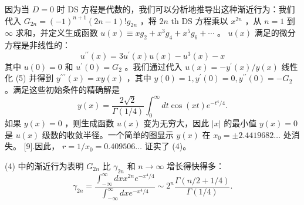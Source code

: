 \documentclass[UTF8]{article}
\begin{document}
因为当    $D=0$    时 DS 方程是代数的，我们可以分析地推导出这种渐近行为：我们代入    $G_{2 n}=(-1)^{n+1}(2 n-1) ! g_{2 n}$    ，将    $2 n$    th DS 方程乘以    $x^{2 n}$    ，从    $n=1$    到    $\infty$    求和，并定义生成函数    $u(x) \equiv x g_2+x^3 g_4+x^5 g_6+\cdots$    。    $u(x)$    满足的微分方程是非线性的：
    $$u^{\prime \prime}(x)=3 u^{\prime}(x) u(x)-u^3(x)-x
$$    其中    $u(0)=0$    和    $u^{\prime}(0)=G_2$    。我们通过代入    $u(x)=-y^{\prime}(x) / y(x)$    线性化 (5) 并得到    $y^{\prime \prime \prime}(x)=x y(x)$    ，其中    $y(0)=1, y^{\prime}(0)=0, y^{\prime \prime}(0)=-G_2$    。满足这些初始条件的精确解是
    $$y(x)=\frac{2 \sqrt{2}}{\Gamma(1 / 4)} \int_0^{\infty} d t \cos (x t) e^{-t^4 / 4} .
$$    如果    $y(x)=0$    ，则生成函数    $u(x)$    变为无穷大，因此    $|x|$    的最小值    $y(x)=0$    是    $u(x)$    级数的收敛半径。一个简单的图显示    $y(x)$    在    $x_0= \pm 2.4419682 \ldots$    处消失。 [9].因此，    $r=1 / x_0=0.409506 \ldots$    证实了 (4)。

(4) 中的渐近行为表明    $G_{2 n}$    比    $\gamma_{2 n}$    和    $n \rightarrow \infty$    增长得快得多：
    $$
\gamma_{2 n}=\frac{\int_{-\infty}^{\infty} d x x^{2 n} e^{-x^4 / 4}}{\int_{-\infty}^{\infty} d x e^{-x^4 / 4}} \sim 2^n \frac{\Gamma(n / 2+1 / 4)}{\Gamma(1 / 4)} .
$$   
\end{document}
